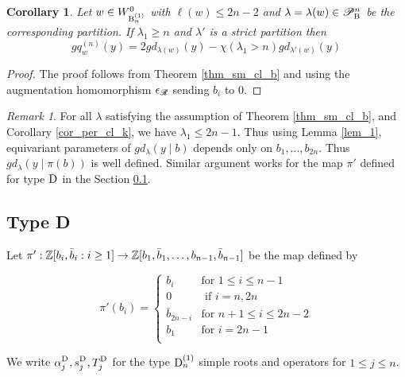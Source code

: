 \documentclass[a4paper]{amsart}
\newcommand{\smark}[1]{\todo[size=\tiny,color=cyan!30]{#1}}
\newtheorem{cor}[thm]{Corollary}
\theoremstyle{remark}
\newtheorem{remark}[thm]{Remark}
\numberwithin{equation}{section}
\begin{document}
\begin{cor}
Let $w\in W_{\mathrm{B}_{n}^{(1)}}^0$ with $\ell(w)\le 2n-2$ and $\lambda=\lambda(w)\in \mathscr{P}^n_{\mathrm{B}_{}}$ be the corresponding partition. If $\lambda_1\ge n$ and $\lambda'$ is a strict partition then
\[ gq_{w}^{(n)}(y)=2gd_{\lambda(w)}(y)-\chi(\lambda_1> n)gd_{\lambda'(w)}(y)
\]
\end{cor}
\begin{proof}
    The proof follows from Theorem \ref{thm_sm_cl_b} and using the augmentation homomorphism  $\epsilon_{\mathscr{R}}$ sending $b_i$ to 0.
\end{proof}

\begin{remark}  
For all $\lambda$ satisfying the assumption of Theorem \ref{thm_sm_cl_b}, and Corollary \ref{cor_per_cl_k}, we have $\lambda_1 \le 2n-1$. Thus using Lemma \ref{lem_1}, equivariant parameters of $gd_\lambda(y\mid b)$ depends only on $b_1,\dots,b_{2n}$. Thus $gd_{\lambda}(y\mid \pi(b))$ is well defined. Similar argument works for the map $\pi'$ defined for type $\mathrm{D}_{}$ in the Section \ref{sec_D}. 
\end{remark}


\subsection{Type D}\label{sec_D}
Let $\pi':\mathbb{Z}[b_i,\bar{b}_i:i\geq 1]\to \mathbb{Z}[b_1,\bar{b}_1,\dots, b_{n-1},\bar{b}_{n-1}]$ be the map defined by  

\[\pi'(b_i)=
\begin{cases}
   b_i& \text{for } 1\leq i\leq n-1\\
   0& \text{ if } i=n,2n\\
   \bar{b}_{2n-i} & \text{for } n+1\leq i\leq 2n-2\\
   {b}_1 & \text{for }  i=2n-1\\
\end{cases}
\]

We write  \(\alpha_j^{\mathrm{D}_{}},s_j^{\mathrm{D}_{}},T_j^{\mathrm{D}_{}}\) for the type \(\mathrm{D}_{n}^{(1)}\) simple roots and operators for $1\le j\le n$.
\end{document}
